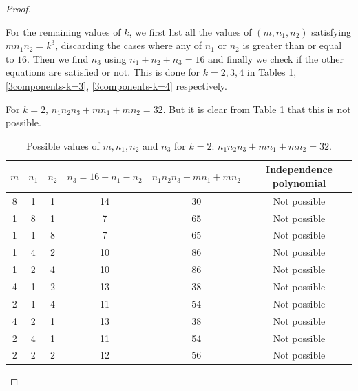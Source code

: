\documentclass[12pt,a4paper]{article}
\theoremstyle{plain}
\newcounter{cases}
\numberwithin{equation}{section}
\begin{document}
\begin{proof}
\begin{enumerate}
 For the remaining values of \(k\), we first list all the values of \((m, n_1, n_2)\)  satisfying  $mn_1 n_2=k^3$, discarding the cases where any of \(n_1\) or \(n_2\) is greater than or equal to \(16\). Then we find $n_3$ using $n_1 +n_2 +n_3 =16$ and finally we check if the other equations are satisfied  or not. This is done for $k=2,3,4$ in Tables \ref{3components-k=2}, \ref{3components-k=3}, \ref{3components-k=4} respectively.
\par  For $k =2$, $n_1n_2n_3 +mn_1 +mn_2 = 32$. But it is clear from Table \ref{3components-k=2} that  this is not possible. 
\begin{table}[h!]
\centering
    \caption{Possible values of $m, n_1, n_2$ and $n_3$ for $k=2$: $n_1n_2n_3 + mn_1 +  mn_2 =32$.}
    \begin{tabular}{|c|c|c|c|c|c|}
    \hline
      $m$ & $n_1$ & $n_2$ & $n_3 =16-n_1 -n_2$ & $n_1n_2n_3 + mn_1 +  mn_2$ &   Independence polynomial  \\
      \hline
       8 & 1 & 1 & 14 & 30 &  Not possible\\    \hline
       1 & 8 & 1 & 7  & 65 &  Not possible\\    \hline
       1 & 1 & 8 & 7  & 65 &  Not possible\\    \hline
       1 & 4 & 2 & 10  & 86 & Not possible\\    \hline
       1 & 2 & 4 & 10 & 86 & Not possible\\    \hline
       4 & 1 & 2 & 13 & 38 & Not possible\\    \hline
       2 & 1 & 4 & 11 & 54 &  Not possible\\    \hline
       4 & 2 & 1 & 13 & 38 &  Not possible\\    \hline
       2 & 4 & 1 & 11 & 54 &  Not possible\\    \hline
       2 & 2 & 2 & 12 & 56 &  Not possible\\   \hline
    \end{tabular}
    \label{3components-k=2}
\end{table}
\FloatBarrier


\end{enumerate}
\end{proof}
\end{document}
